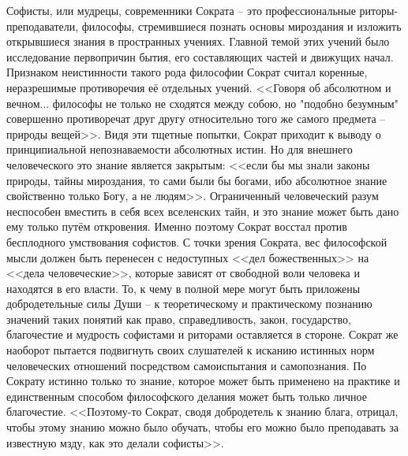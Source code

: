 
Софисты, или мудрецы, современники Сократа -- это профессиональные риторы-преподаватели, философы, 
стремившиеся познать основы мироздания и изложить открывшиеся знания в пространных учениях. Главной темой 
этих учений было исследование первопричин бытия, его составляющих частей и движущих начал. Признаком 
неистинности такого рода философии Сократ считал коренные, неразрешимые противоречия её отдельных учений. 
<<Говоря об абсолютном и вечном... философы не только не сходятся между собою, но "подобно безумным" 
совершенно противоречат друг другу относительно того же самого предмета -- природы вещей>>. Видя эти тщетные 
попытки, Сократ приходит к выводу о принципиальной непознаваемости абсолютных истин. Но для внешнего 
человеческого это знание является закрытым: <<если бы мы знали законы природы, тайны мироздания, то сами были 
бы богами, ибо абсолютное знание свойственно только Богу, а не людям>>. Ограниченный человеческий разум 
неспособен вместить в себя всех вселенских тайн, и это знание может быть дано ему только путём откровения. 
Именно поэтому Сократ восстал против бесплодного умствования софистов. С точки зрения Сократа, вес 
философской мысли должен быть перенесен с недоступных <<дел божественных>> на <<дела человеческие>>, которые 
зависят от свободной воли человека и находятся в его власти. То, к чему в полной мере могут быть приложены 
добродетельные силы Души -- к теоретическому и практическому познанию значений таких понятий как право, 
справедливость, закон, государство, благочестие и мудрость софистами и риторами оставляется в стороне. Сократ 
же наоборот пытается подвигнуть своих слушателей к исканию истинных норм человеческих отношений посредством 
самоиспытания и самопознания. По Сократу истинно только то знание, которое может быть применено на практике и 
единственным способом философского делания может быть только личное благочестие. <<Поэтому-то Сократ, сводя 
добродетель к знанию блага, отрицал, чтобы этому знанию можно было обучать, чтобы его можно было преподавать 
за известную мзду, как это делали софисты>>.

